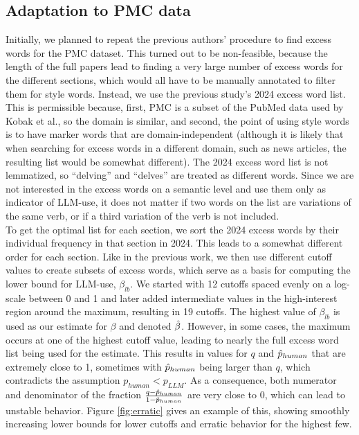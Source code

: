 \subsection{Adaptation to PMC data}
Initially, we planned to repeat the previous authors' procedure to find excess words for the PMC dataset.
This turned out to be non-feasible, because the length of the full papers lead to finding a very large number of excess words for the different sections, which would all have to be manually annotated to filter them for style words.
Instead, we use the previous study's 2024 excess word list.
This is permissible because, first, PMC is a subset of the PubMed data used by Kobak et al., so the domain is similar, and second, the point of using style words is to have marker words that are domain-independent
(although it is likely that when searching for excess words in a different domain, such as news articles, the resulting list would be somewhat different).
The 2024 excess word list is not lemmatized, so ``delving'' and ``delves'' are treated as different words.
Since we are not interested in the excess words on a semantic level and use them only as indicator of LLM-use, it does not matter if two words on the list are variations of the same verb, or if a third variation of the verb is not included.
\\
To get the optimal list for each section, we sort the 2024 excess words by their individual frequency in that section in 2024.
This leads to a somewhat different order for each section.
Like in the previous work, we then use different cutoff values to create subsets of excess words, which serve as a basis for computing the lower bound for LLM-use, $\beta_{lb}$.
We started with 12 cutoffs spaced evenly on a log-scale between 0 and 1 and later added intermediate values in the high-interest region around the maximum, resulting in 19 cutoffs.
The highest value of $\beta_{lb}$ is used as our estimate for $\beta$ and denoted $\hat{\beta}$.
However, in some cases, the maximum occurs at one of the highest cutoff value, leading to nearly the full excess word list being used for the estimate.
This results in values for $q$ and $\hat{p}_{human}$ that are extremely close to 1, sometimes with $\hat{p}_{human}$ being larger than $q$, which contradicts the assumption $p_{human} < p_{LLM}$.
As a consequence, both numerator and denominator of the fraction $\frac{q - \hat{p}_{human}}{1-\hat{p}_{human}}$ are very close to 0, which can lead to unstable behavior.
Figure \ref{fig:erratic} gives an example of this, showing smoothly increasing lower bounds for lower cutoffs and erratic behavior for the highest few.
